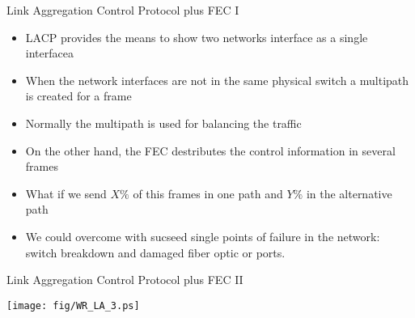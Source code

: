 \documentclass[compress,red]{beamer}
\begin{document}
\begin{frame}{Link Aggregation Control Protocol plus FEC I}

\begin{itemize}
    \item LACP provides the means to show two networks interface as a single  interfacea
    \item When the network interfaces are not in the same physical switch a  multipath is created for a frame
    \item Normally the multipath is used for balancing the traffic
    \item On the other hand, the FEC destributes the control information in several frames
    \item What if we send $X\%$ of this frames in one path and $Y\%$ in the alternative path
    \item We could overcome with sucseed single points of failure in the network: switch breakdown and damaged fiber optic or ports.
\end{itemize}
\end{frame}

\begin{frame}{Link Aggregation Control Protocol plus FEC II}

      \begin{center}
	        \texttt{[image: fig/WR\_LA\_3.ps]}
      \end{center}
\end{frame}
\end{document}
